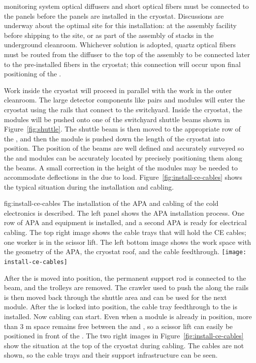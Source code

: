  monitoring system optical diffusers and short optical fibers must be connected to the  panels before the panels are installed in the cryostat.  Discussions are underway about the optimal site for this installation:  at the  assembly facility before shipping to the site, or as part of the assembly of  stacks in the underground cleanroom.  Whichever solution is adopted, quartz optical fibers must be routed from the diffuser to the top of the  assembly to be connected later to the pre-installed fibers in the cryostat; this connection will occur upon final positioning of the .  

Work inside the cryostat will proceed in parallel with the work in the outer cleanroom. 
The large detector components like  pairs and  modules will enter the cryostat using the  rails that connect to the  switchyard.
Inside the cryostat, the modules will be pushed onto one of the switchyard shuttle beams shown in  Figure~\ref{fig:shuttle}. 
The  shuttle beam is then moved to the appropriate row of the , and then the module is pushed down the length of the cryostat into position. The position of the  beams are well defined and accurately surveyed so the  and  modules can be accurately located by precisely positioning them along the  beams. A small correction in the height of the modules may be needed to accommodate deflections in the  due to load. Figure~\ref{fig:install-ce-cables} shows the typical situation during the  installation and  cabling. 

\begin{dunefigure}{fig:install-ce-cables}
  {The installation of the APA and cabling of the cold electronics is described. The left panel shows the APA installation process. One row of APA and  equipment is installed, and a second APA is ready for electrical cabling. The top right image shows the cable trays that will hold the CE cables; one worker is in the scissor lift. The left bottom image shows the work space with the geometry of the APA, the cryostat roof, and the cable feedthrough.}
\texttt{[image: install-ce-cables]}
\end{dunefigure}

After the  is moved into position, the permanent support rod is connected to the  beam, and the trolleys are removed. 
The crawler used to push the  along the rails is then moved back through the shuttle area and can be used for the next module. 
After the  is locked into position, the cable tray feedthrough to the  is installed. Now  cabling can start. 
Even when a  module is already in position, more than 3 \si{m} space remains free between the  and , so a scissor lift can easily be positioned in front of the . 
The two right images in Figure~\ref{fig:install-ce-cables} show the situation at the top of the cryostat during cabling. The cables are not shown, so the cable trays and their support infrastructure can be seen. 

